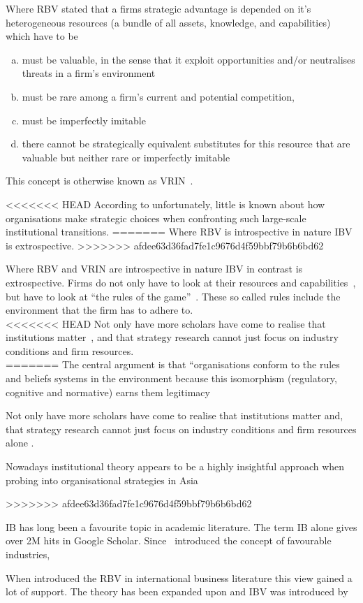Where \gls{RBV} stated that a firms strategic advantage is depended on it's heterogeneous resources (a bundle of all assets, knowledge, and capabilities) which have to be 
\begin{enumerate}[(a)]
\item must be valuable, in the sense that it exploit opportunities and/or neutralises threats in a firm’s environment
\item must be rare among a firm’s current and potential competition, 
\item must be imperfectly imitable
\item  there cannot be strategically equivalent substitutes for this resource that are valuable but neither rare or imperfectly imitable 
\end{enumerate} 
This concept is otherwise known as VRIN~\cite{Barney:1991}. 

<<<<<<< HEAD
According to \cite{Peng:2003} unfortunately, little is known about how organisations make strategic choices when confronting such large-scale institutional transitions.
=======
Where \gls{RBV}  is introspective in nature \gls{IBV} is extrospective.
>>>>>>> afdee63d36fad7fe1c9676d4f59bbf79b6b6bd62

Where \gls{RBV} and VRIN are introspective in nature \gls{IBV} in contrast is extrospective. Firms do not only have to look at their resources and capabilities~\cite{Barney:1991}, but have to look at ``the rules of the game''~\cite{Scott:2001}. These so called rules include the environment that the firm \nme has to adhere to.\\

<<<<<<< HEAD
Not only have   more scholars have come to realise that institutions matter~\cite{Powell:1991,Scott:2001}, and that strategy research cannot just focus on industry conditions and firm resources.\\
=======
The central argument is that “organisations conform to the rules and beliefs systems in the environment because this isomorphism (regulatory, cognitive and normative) earns them legitimacy


Not only have more scholars have come to realise that institutions matter and, that strategy research cannot just focus on industry conditions and firm resources alone \cite{Powell:1991,Scott:2001}.

Nowadays institutional theory appears to be a highly insightful approach when probing into organisational strategies in Asia~\cite{Hoskisson:2000}

>>>>>>> afdee63d36fad7fe1c9676d4f59bbf79b6b6bd62

\Gls{IB} has long been a favourite topic in academic literature. The term \gls{IB} alone gives over 2M hits in Google Scholar. Since~\cite{Porter:1980} introduced the concept of favourable industries, 

When introduced the \gls{RBV} in international business literature this view gained a lot of support. 
The theory has been expanded upon and \gls{IBV} was introduced by~\cite{Kostova:1999,Meyer:2009,Wang:2012}
